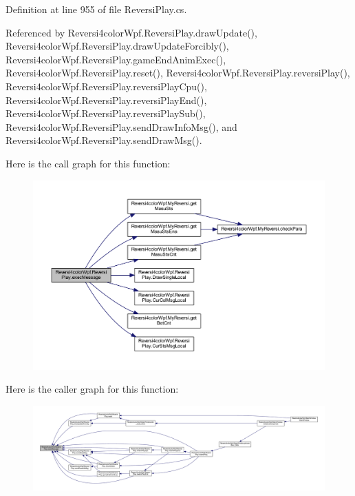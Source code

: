 Definition at line 955 of file Reversi\+Play.\+cs.



Referenced by Reversi4color\+Wpf.\+Reversi\+Play.\+draw\+Update(), Reversi4color\+Wpf.\+Reversi\+Play.\+draw\+Update\+Forcibly(), Reversi4color\+Wpf.\+Reversi\+Play.\+game\+End\+Anim\+Exec(), Reversi4color\+Wpf.\+Reversi\+Play.\+reset(), Reversi4color\+Wpf.\+Reversi\+Play.\+reversi\+Play(), Reversi4color\+Wpf.\+Reversi\+Play.\+reversi\+Play\+Cpu(), Reversi4color\+Wpf.\+Reversi\+Play.\+reversi\+Play\+End(), Reversi4color\+Wpf.\+Reversi\+Play.\+reversi\+Play\+Sub(), Reversi4color\+Wpf.\+Reversi\+Play.\+send\+Draw\+Info\+Msg(), and Reversi4color\+Wpf.\+Reversi\+Play.\+send\+Draw\+Msg().



Here is the call graph for this function\+:
\nopagebreak
\begin{figure}[H]
\begin{center}
\leavevmode
\includegraphics[width=350pt]{class_reversi4color_wpf_1_1_reversi_play_ababce684128da36e97a45ad8a13e4b71_cgraph}
\end{center}
\end{figure}




Here is the caller graph for this function\+:
\nopagebreak
\begin{figure}[H]
\begin{center}
\leavevmode
\includegraphics[width=350pt]{class_reversi4color_wpf_1_1_reversi_play_ababce684128da36e97a45ad8a13e4b71_icgraph}
\end{center}
\end{figure}


